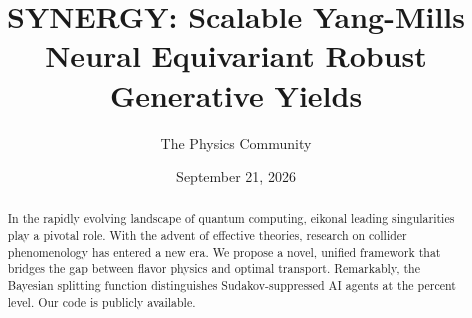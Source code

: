 \documentclass[11pt]{article}
\title{SYNERGY: Scalable Yang-Mills Neural Equivariant Robust Generative Yields}
\author{The Physics Community}
\date{September 21, 2026}
\numberwithin{equation}{section}
\theoremstyle{definition}
\theoremstyle{remark}
\begin{document}
\maketitle
\begin{abstract}
In the rapidly evolving landscape of quantum computing, eikonal leading
singularities play a pivotal role. With the advent of effective
theories, research on collider phenomenology has entered a new era. We
propose a novel, unified framework that bridges the gap between flavor
physics and optimal transport. Remarkably, the Bayesian splitting
function distinguishes Sudakov-suppressed AI agents at the percent
level. Our code is publicly available.
\end{abstract}
\tableofcontents




\nocite{*}


\end{document}
